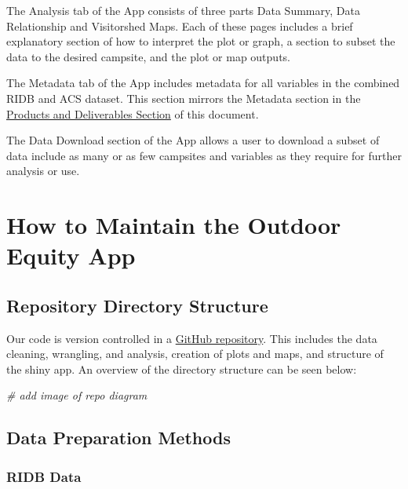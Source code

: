 \documentclass[
  11 pt,
  openany]{book}
\newenvironment{Shaded}{\begin{snugshade}}{\end{snugshade}}
\newcommand{\CommentTok}[1]{\textcolor[rgb]{0.56,0.35,0.01}{\textit{#1}}}
\begin{document}
The Analysis tab of the App consists of three parts Data Summary, Data Relationship and Visitorshed Maps. Each of these pages includes a brief explanatory section of how to interpret the plot or graph, a section to subset the data to the desired campsite, and the plot or map outputs.

The Metadata tab of the App includes metadata for all variables in the combined RIDB and ACS dataset. This section mirrors the Metadata section in the \protect\hyperlink{products-and-deliverables}{Products and Deliverables Section} of this document.

The Data Download section of the App allows a user to download a subset of data include as many or as few campsites and variables as they require for further analysis or use.

\hypertarget{how-to-maintain-the-outdoor-equity-app}{%
\section{How to Maintain the Outdoor Equity App}\label{how-to-maintain-the-outdoor-equity-app}}

\hypertarget{repository-directory-structure}{%
\subsection{Repository Directory Structure}\label{repository-directory-structure}}

Our code is version controlled in a \href{https://github.com/outdoor-equity/outdoor-equity}{GitHub repository}. This includes the data cleaning, wrangling, and analysis, creation of plots and maps, and structure of the shiny app. An overview of the directory structure can be seen below:

\begin{Shaded}
\begin{Highlighting}[]
\CommentTok{\# add image of repo diagram}
\end{Highlighting}
\end{Shaded}

\hypertarget{data-preparation-methods}{%
\subsection{Data Preparation Methods}\label{data-preparation-methods}}

\hypertarget{ridb-data}{%
\subsubsection{RIDB Data}\label{ridb-data}}
\end{document}
